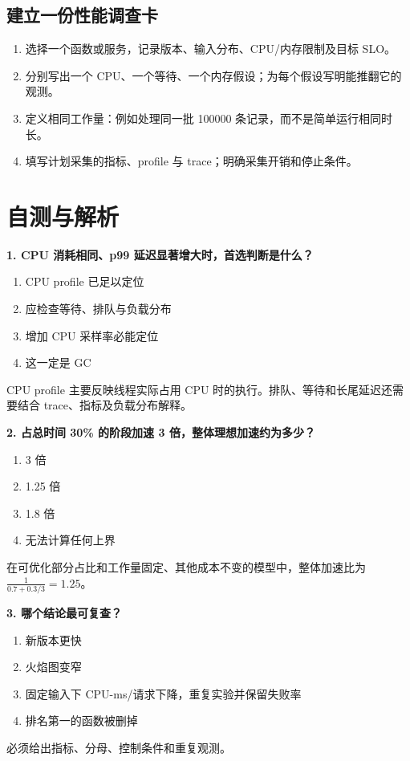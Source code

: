 \documentclass[UTF8,fontset=fandol,openany,11pt]{ctexbook}
\begin{document}
\subsection*{建立一份性能调查卡}
\begin{enumerate}
\item 选择一个函数或服务，记录版本、输入分布、CPU/内存限制及目标 SLO。

\item 分别写出一个 CPU、一个等待、一个内存假设；为每个假设写明能推翻它的观测。

\item 定义相同工作量：例如处理同一批 100000 条记录，而不是简单运行相同时长。

\item 填写计划采集的指标、profile 与 trace；明确采集开销和停止条件。

\end{enumerate}
\section{自测与解析}
\noindent\textbf{1. CPU 消耗相同、p99 延迟显著增大时，首选判断是什么？}
\begin{enumerate}[label=\Alph*.]
\item CPU profile 已足以定位
\item 应检查等待、排队与负载分布
\item 增加 CPU 采样率必能定位
\item 这一定是 GC
\end{enumerate}
CPU profile 主要反映线程实际占用 CPU 时的执行。排队、等待和长尾延迟还需要结合 trace、指标及负载分布解释。

\noindent\textbf{2. 占总时间 30\% 的阶段加速 3 倍，整体理想加速约为多少？}
\begin{enumerate}[label=\Alph*.]
\item 3 倍
\item 1.25 倍
\item 1.8 倍
\item 无法计算任何上界
\end{enumerate}
在可优化部分占比和工作量固定、其他成本不变的模型中，整体加速比为 \(\frac{1}{0.7+0.3/3}=1.25\)。

\noindent\textbf{3. 哪个结论最可复查？}
\begin{enumerate}[label=\Alph*.]
\item 新版本更快
\item 火焰图变窄
\item 固定输入下 CPU-ms/请求下降，重复实验并保留失败率
\item 排名第一的函数被删掉
\end{enumerate}
必须给出指标、分母、控制条件和重复观测。
\end{document}
